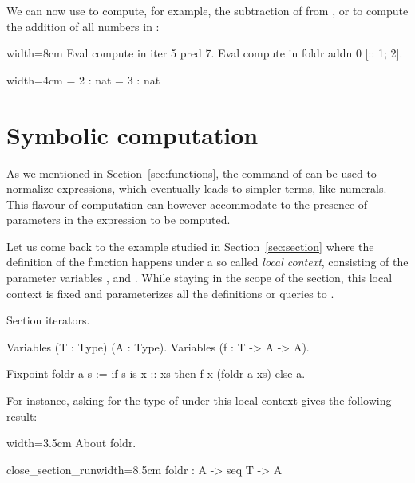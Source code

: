 We can now use  to compute, for example,
the subtraction of  from , or 
to compute the
addition of all numbers in \C{[:: 1; 2]}:

\begin{coq}{}{width=8cm}
Eval compute in iter 5 pred 7.
Eval compute in foldr addn 0 [:: 1; 2].
\end{coq}
\begin{coqout}{}{width=4cm}
 = 2 : nat
 = 3 : nat
\end{coqout}



\section{Symbolic computation}\label{sec:symcomp}

As we mentioned in Section~\ref{sec:functions}, the 
command of \Coq{} can be used to normalize expressions, which
eventually leads to simpler terms, like numerals. This flavour of
computation can however accommodate to the presence of parameters in
the expression to be computed.

Let us come back to the example studied in Section~\ref{sec:section} where
the definition of the  function happens under a so called
\emph{local context}, consisting of the parameter variables ,
 and . While staying in the scope of the 
section, this local context is fixed and parameterizes all the
definitions or queries to \Coq{}.

\begin{coq}{}{}
Section iterators.

Variables (T : Type) (A : Type).
Variables (f : T -> A -> A).

Fixpoint foldr a s :=
  if s is x :: xs then f x (foldr a xs) else a.
\end{coq}

For instance, asking for the type of
  under this local context gives the following result:

\begin{coq}{}{width=3.5cm}
About foldr.
\end{coq}
\begin{coqout}{close_section_run}{width=8.5cm}
foldr : A -> seq T -> A
\end{coqout}

